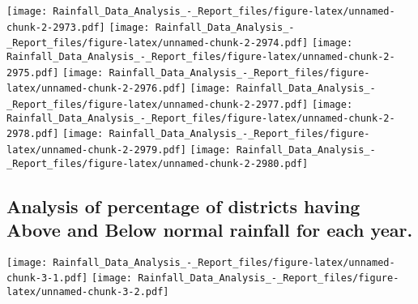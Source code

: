 \documentclass[
]{article}
\begin{document}
\texttt{[image: Rainfall\_Data\_Analysis\_-\_Report\_files/figure-latex/unnamed-chunk-2-2973.pdf]}
\texttt{[image: Rainfall\_Data\_Analysis\_-\_Report\_files/figure-latex/unnamed-chunk-2-2974.pdf]}
\texttt{[image: Rainfall\_Data\_Analysis\_-\_Report\_files/figure-latex/unnamed-chunk-2-2975.pdf]}
\texttt{[image: Rainfall\_Data\_Analysis\_-\_Report\_files/figure-latex/unnamed-chunk-2-2976.pdf]}
\texttt{[image: Rainfall\_Data\_Analysis\_-\_Report\_files/figure-latex/unnamed-chunk-2-2977.pdf]}
\texttt{[image: Rainfall\_Data\_Analysis\_-\_Report\_files/figure-latex/unnamed-chunk-2-2978.pdf]}
\texttt{[image: Rainfall\_Data\_Analysis\_-\_Report\_files/figure-latex/unnamed-chunk-2-2979.pdf]}
\texttt{[image: Rainfall\_Data\_Analysis\_-\_Report\_files/figure-latex/unnamed-chunk-2-2980.pdf]}

\hypertarget{analysis-of-percentage-of-districts-having-above-and-below-normal-rainfall-for-each-year.}{%
\subsection{Analysis of percentage of districts having Above and Below
normal rainfall for each
year.}\label{analysis-of-percentage-of-districts-having-above-and-below-normal-rainfall-for-each-year.}}

\texttt{[image: Rainfall\_Data\_Analysis\_-\_Report\_files/figure-latex/unnamed-chunk-3-1.pdf]}
\texttt{[image: Rainfall\_Data\_Analysis\_-\_Report\_files/figure-latex/unnamed-chunk-3-2.pdf]}
\end{document}
